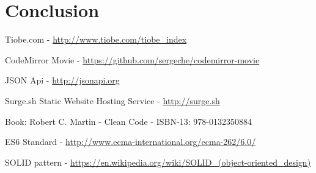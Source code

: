 \documentclass[12pt, a4paper, oneside, openright, medskipamount]{report}
\begin{document}
\chapter{Conclusion}




\backmatter




\begin{thebibliography}{9}

Tiobe.com - \url{http://www.tiobe.com/tiobe_index}

CodeMirror Movie - \url{https://github.com/sergeche/codemirror-movie}

JSON Api - \url{http://jsonapi.org}

Surge.sh Static Website Hosting Service - \url{http://surge.sh}

Book: Robert C. Martin - Clean Code - ISBN-13: 978-0132350884

ES6 Standard - \url{http://www.ecma-international.org/ecma-262/6.0/}

SOLID pattern - \url{https://en.wikipedia.org/wiki/SOLID_(object-oriented_design)}

\end{thebibliography}

\end{document}
